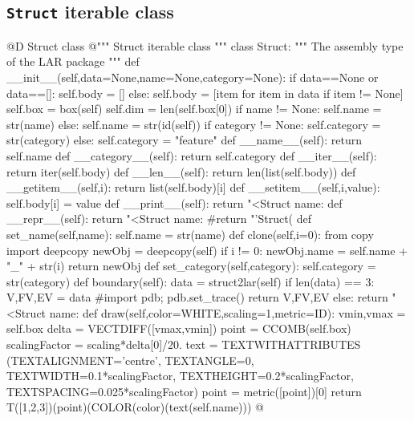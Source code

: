 \documentclass[11pt,oneside]{article}    %
\begin{document}
\subsection{\texttt{Struct} iterable class}
@D Struct class
@{""" Struct iterable class """
class Struct:
    """ The assembly type of the LAR package """
    def __init__(self,data=None,name=None,category=None):
        if data==None or data==[]:
            self.body = []
        else:
            self.body = [item for item in data if item != None]
            self.box = box(self) 
            self.dim = len(self.box[0])
        if name != None: 
            self.name = str(name)
        else:
            self.name = str(id(self))
        if category != None: 
            self.category = str(category)
        else:
            self.category = "feature"
    def __name__(self):
        return self.name
    def __category__(self):
        return self.category
    def __iter__(self):
        return iter(self.body)
    def __len__(self):
        return len(list(self.body))
    def __getitem__(self,i):
        return list(self.body)[i]
    def __setitem__(self,i,value):
        self.body[i] = value
    def __print__(self): 
        return "<Struct name: %
    def __repr__(self):
        return "<Struct name: %
        #return "'Struct(%
    def set_name(self,name):
        self.name = str(name)
    def clone(self,i=0):
        from copy import deepcopy
        newObj = deepcopy(self)
        if i != 0: newObj.name = self.name + "_" + str(i)
        return newObj
    def set_category(self,category):
        self.category = str(category)
    def boundary(self):
        data = struct2lar(self)
        if len(data) == 3:
            V,FV,EV = data
            #import pdb; pdb.set_trace()
            return V,FV,EV
        else:
            return "<Struct name: %
    def draw(self,color=WHITE,scaling=1,metric=ID):
        vmin,vmax = self.box
        delta = VECTDIFF([vmax,vmin])
        point = CCOMB(self.box)
        scalingFactor = scaling*delta[0]/20.
        text = TEXTWITHATTRIBUTES (TEXTALIGNMENT='centre', TEXTANGLE=0,
                    TEXTWIDTH=0.1*scalingFactor, 
                    TEXTHEIGHT=0.2*scalingFactor,
                    TEXTSPACING=0.025*scalingFactor)
        point = metric([point])[0]
        return T([1,2,3])(point)(COLOR(color)(text(self.name)))
@}
\end{document}
